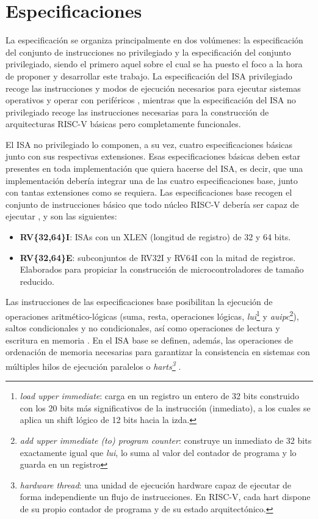 \section{Especificaciones}

La especificación se organiza principalmente en dos volúmenes: la especificación del conjunto de instrucciones no privilegiado y la especificación del conjunto privilegiado, siendo el primero aquel sobre el cual se ha puesto el foco a la hora de proponer y desarrollar este trabajo. La especificación del ISA privilegiado recoge las instrucciones y modos de ejecución necesarios para ejecutar sistemas operativos y operar con periféricos \cite{riscv-unpriv-isa-20250508-priv-isa-brief}, mientras que la especificación del ISA no privilegiado recoge las instrucciones necesarias para la construcción de arquitecturas RISC-V básicas pero completamente funcionales.

El ISA no privilegiado lo componen, a su vez, cuatro especificaciones básicas junto con sus respectivas extensiones. Esas especificaciones básicas deben estar presentes en toda implementación que quiera hacerse del ISA, es decir, que una implementación debería integrar una de las cuatro especificaciones base, junto con tantas extensiones como se requiera. Las especificaciones base recogen el conjunto de instrucciones básico que todo núcleo RISC-V debería ser capaz de ejecutar  \cite{riscv-unpriv-isa-20250508-unpriv-isa-brief}, y son las siguientes:

\begin{itemize}
  \item \textbf{RV\{32,64\}I}: ISAs con un XLEN (longitud de registro) de 32 y 64 bits.
  \vspace{-0.2cm}
  \item \textbf{RV\{32,64\}E}: subconjuntos de RV32I y RV64I con la mitad de registros. Elaborados para propiciar la construcción de microcontroladores de tamaño reducido.
\end{itemize}

Las instrucciones de las especificaciones base posibilitan la ejecución de operaciones aritmético-lógicas (suma, resta, operaciones lógicas, \textit{lui}\footnote{\textit{load upper immediate}: carga en un registro un entero de 32 bits construido con los 20 bits más significativos de la instrucción (inmediato), a los cuales se aplica un shift lógico de 12 bits hacia la izda.} y \textit{auipc}\footnote{\textit{add upper immediate (to) program counter}: construye un inmediato de 32 bits exactamente igual que \textit{lui}, lo suma al valor del contador de programa y lo guarda en un registro}), saltos condicionales y no condicionales, así como operaciones de lectura y escritura en memoria \cite{riscv-unpriv-isa-20250508-unpriv-isa-arit-instr}. En el ISA base se definen, además, las operaciones de ordenación de memoria necesarias para garantizar la consistencia en sistemas con múltiples hilos de ejecución paralelos o \textit{harts\footnote{\textit{hardware thread}: una unidad de ejecución hardware capaz de ejecutar de forma independiente un flujo de instrucciones. En RISC-V, cada hart dispone de su propio contador de programa y de su estado arquitectónico.}} \cite{riscv-unpriv-isa-20250508-unpriv-isa-mem-order}.

